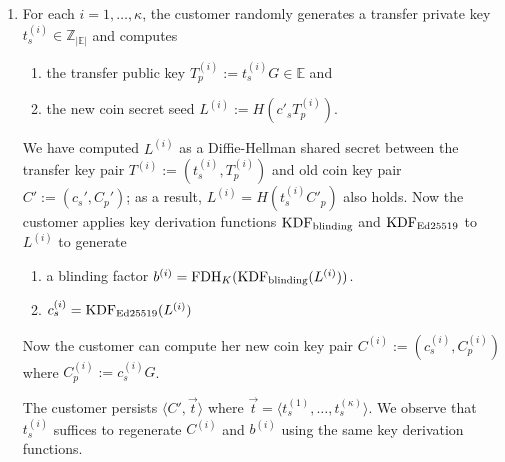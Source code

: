 \documentclass[sigconf, authordraft]{acmart}
\newcommand\inecc{\in \mathbb{Z}_{|\mathbb{E}|}}
\newcommand\inept{\in {\mathbb{E}}}
\begin{document}
\begin{enumerate}
\item %
    For each $i = 1,\ldots,\kappa$, the customer randomly generates
    a transfer private key $t^{(i)}_s \inecc$ and computes
    \begin{enumerate}
    \item the transfer public key $T^{(i)}_p := t^{(i)}_s G \inept$ and
    \item the new coin secret seed $L^{(i)} := H(c'_s T_p^{(i)})$.
    \end{enumerate}
    We have computed $L^{(i)}$ as a Diffie-Hellman shared secret between
    the transfer key pair $T^{(i)} := \left(t^{(i)}_s,T^{(i)}_p\right)$
    and old coin key pair $C' := \left(c_s', C_p'\right)$;
    as a result, $L^{(i)} = H(t^{(i)}_s C'_p)$ also holds.
    Now the customer applies key derivation functions $\textrm{KDF}_{\textrm{blinding}}$ and $\textrm{KDF}_{\textrm{Ed25519}}$ to $L^{(i)}$ to generate
    \begin{enumerate}
      \item a blinding factor $b^{(i)} = \textrm{FDH}_K(\textrm{KDF}_{\textrm{blinding}}(L^{(i)}))$.
      \item $c_s^{(i)} = \textrm{KDF}_{\textrm{Ed25519}}(L^{(i)})$
    \end{enumerate}
    Now the customer can compute her new coin key pair
     $C^{(i)} := \left(c_s^{(i)}, C_p^{(i)}\right)$
     where $C^{(i)}_p := c^{(i)}_s G$.

    The customer persists $\langle C', \vec{t}\rangle$ where
    $\vec{t} = \langle t^{(1)}_s, \ldots, t^{(\kappa)}_s \rangle$.
    We observe that $t^{(i)}_s$ suffices to regenerate $C^{(i)}$ and $b^{(i)}$
    using the same key derivation functions.


\end{enumerate}
\end{document}
